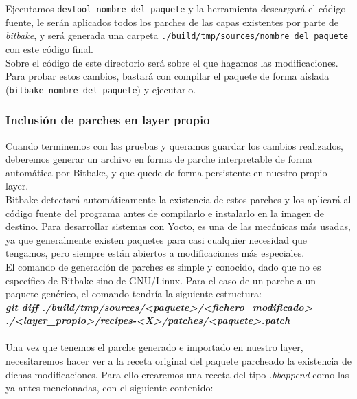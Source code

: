 Ejecutamos \texttt{devtool nombre\_del\_paquete} y la herramienta descargará el código fuente, le serán aplicados todos los parches de las capas existentes por parte de \textit{bitbake}, y será generada una carpeta \texttt{./build/tmp/sources/nombre\_del\_paquete} con este código final.\\

Sobre el código de este directorio será sobre el que hagamos las modificaciones. Para probar estos cambios, bastará con compilar el paquete de forma aislada (\texttt{bitbake nombre\_del\_paquete}) y ejecutarlo.\\

\subsubsection{Inclusión de parches en layer propio}

Cuando terminemos con las pruebas y queramos guardar los cambios realizados, deberemos generar un archivo en forma de parche interpretable de forma automática por Bitbake, y que quede de forma persistente en nuestro propio layer.\\

Bitbake detectará automáticamente la existencia de estos parches y los aplicará al código fuente del programa antes de compilarlo e instalarlo en la imagen de destino. Para desarrollar sistemas con Yocto, es una de las mecánicas más usadas, ya que generalmente existen paquetes para casi cualquier necesidad que tengamos, pero siempre están abiertos a modificaciones más especiales.\\

El comando de generación de parches es simple y conocido, dado que no es específico de Bitbake sino de GNU/Linux. Para el caso de un parche a un paquete genérico, el comando tendría la siguiente estructura:\\

\textit{\textbf{git diff ./build/tmp/sources/<paquete>/<fichero\_modificado> \\./<layer\_propio>/recipes-<X>/patches/<paquete>.patch}}\\

\noindent\makebox[\linewidth]{\rule{\textwidth}{0.4pt}}\\

Una vez que tenemos el parche generado e importado en nuestro layer, necesitaremos hacer ver a la receta original del paquete parcheado la existencia de dichas modificaciones. Para ello crearemos una receta del tipo \textit{.bbappend} como las ya antes mencionadas, con el siguiente contenido:

